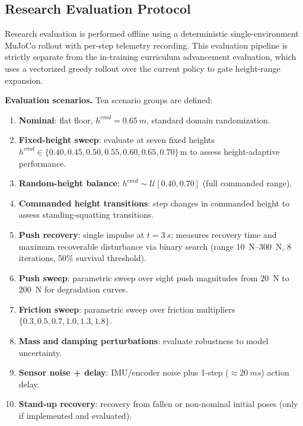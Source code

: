 \documentclass[conference]{IEEEtran}
\begin{document}
\subsection{Research Evaluation Protocol}
\label{sec:eval_protocol}
Research evaluation is performed offline using a deterministic
single-environment MuJoCo rollout with per-step telemetry recording.
This evaluation pipeline is strictly separate from the in-training
curriculum advancement evaluation, which uses a vectorized greedy
rollout over the current policy to gate height-range expansion.

\noindent\textbf{Evaluation scenarios.}
Ten scenario groups are defined:

\begin{enumerate}
    \item \textbf{Nominal}: flat floor, $h^{cmd} = \SI{0.65}{m}$,
    standard domain randomization.
    \item \textbf{Fixed-height sweep}: evaluate at seven fixed heights
    $h^{cmd} \in \{0.40, 0.45, 0.50, 0.55, 0.60, 0.65, 0.70\}\,\mathrm{m}$
    to assess height-adaptive performance.
    \item \textbf{Random-height balance}: $h^{cmd} \sim \mathcal{U}[0.40, 0.70]$
    (full commanded range).
    \item \textbf{Commanded height transitions}: step changes in commanded
    height to assess standing-squatting transitions.
    \item \textbf{Push recovery}: single impulse at $t = \SI{3}{s}$;
    measures recovery time and maximum recoverable disturbance via binary
    search (range \SIrange{10}{300}{N}, 8 iterations, 50\% survival threshold).
    \item \textbf{Push sweep}: parametric sweep over eight push
    magnitudes from \SI{20}{N} to \SI{200}{N} for degradation curves.
    \item \textbf{Friction sweep}: parametric sweep over
    friction multipliers $\{0.3, 0.5, 0.7, 1.0, 1.3, 1.8\}$.
    \item \textbf{Mass and damping perturbations}: evaluate robustness
    to model uncertainty.
    \item \textbf{Sensor noise + delay}: IMU/encoder noise plus
    1-step ($\approx\SI{20}{ms}$) action delay.
    \item \textbf{Stand-up recovery}: recovery from fallen or non-nominal
    initial poses (only if implemented and evaluated).
\end{enumerate}
\end{document}
